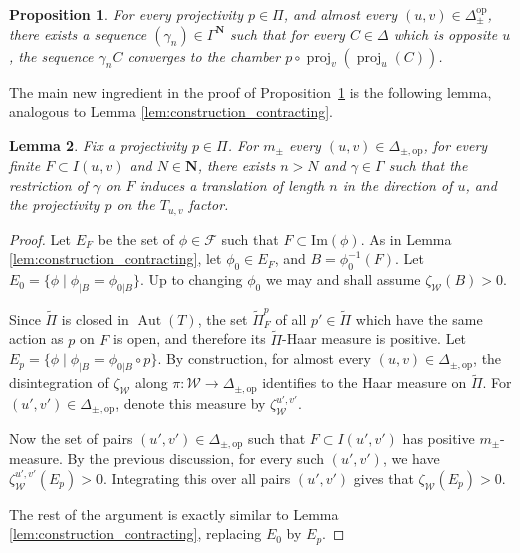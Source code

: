 \documentclass[a4paper, 11pt]{article}
\theoremstyle{plain}
\newtheorem{proposition}{Proposition}[section]
\newtheorem{lemma}[proposition]{Lemma}
\theoremstyle{definition}
\theoremstyle{remark}
\DeclareMathOperator{\Aut}{Aut}
\DeclareMathOperator{\proj}{proj}
\newcommand{\NN}{\mathbf{N}}                          %
\renewcommand{\Im}{\mathrm{Im}}
\newcommand{\scrF}{\mathscr F}
\newcommand{\scrW}{\mathscr W}
\newcommand{\op}{\mathrm{op}}
\newcommand{\pmop}{ {\pm,\mathrm{op}}}
\begin{document}
\begin{proposition}\label{prop:Poincare2}
For every projectivity $p\in\Pi$, and almost every $(u,v)\in \Delta_\pm^\op$,  there exists a sequence $(\gamma_n)\in \Gamma^\NN$ such that for  every $C\in \Delta$ which is opposite $u$, the sequence $\gamma_n C$ converges to the chamber $p\circ \proj_v(\proj_u(C))$.
\end{proposition}

 The main new ingredient in the proof of Proposition~\ref{prop:Poincare2} is the following lemma,  analogous to Lemma \ref{lem:construction_contracting}.


\begin{lemma}\label{lem:construction2}
Fix a projectivity $p\in \Pi$. 
 For $m_\pm$ every $(u,v)\in \Delta_\pmop$, for every finite $F\subset I(u,v)$ and $N\in \NN$, there exists $n>N$ and $\gamma\in \Gamma$ such that the restriction of $\gamma$  on $F$ induces a translation of length $n$ in the direction of $u$, and the projectivity $p$ on the $T_{u,v}$ factor.
\end{lemma}

\begin{proof}
Let $E_F$ be the set of $\phi\in\scrF$ such that $F\subset \Im(\phi)$.
As in Lemma \ref{lem:construction_contracting}, let $\phi_0\in E_F$, and $B=\phi_0^{-1}(F)$. Let $E_{0}=\{\phi\mid \phi_{|B}=\phi_{0|B}\}$. Up to changing $\phi_0$ we may and shall assume $\zeta_\scrW(B)>0$. 

Since $\tilde \Pi$ is closed in $\Aut(T)$, the set $\tilde \Pi_F^p$ of all $p'\in \tilde \Pi$ which have the same action as $p$ on $F$ is open, and therefore its $\tilde \Pi$-Haar measure is positive. Let $E_{p}=\{\phi\mid \phi_{|B} = \phi_{0|B}\circ p\}$. By construction, for almost every $(u,v)\in\Delta_\pmop$, the disintegration of $\zeta_\scrW$ along $\pi:\scrW\to \Delta_\pmop$ identifies to the Haar measure on $\tilde \Pi$. For $(u',v')\in \Delta_\pmop$, denote this measure by $\zeta^{u',v'}_\scrW$.

Now the set of pairs $(u',v')\in\Delta_\pmop$ such that $F\subset I(u',v')$ has positive $m_\pm$-measure. By the previous discussion, for  every such $(u',v')$, we have $\zeta^{u',v'}_\scrW(E_p)>0$. Integrating this over all pairs $(u',v')$ gives that $\zeta_{\scrW}(E_p)>0$.

The rest of the argument is exactly similar to Lemma \ref{lem:construction_contracting}, replacing $E_0$ by $E_p$.
\end{proof}
\end{document}
